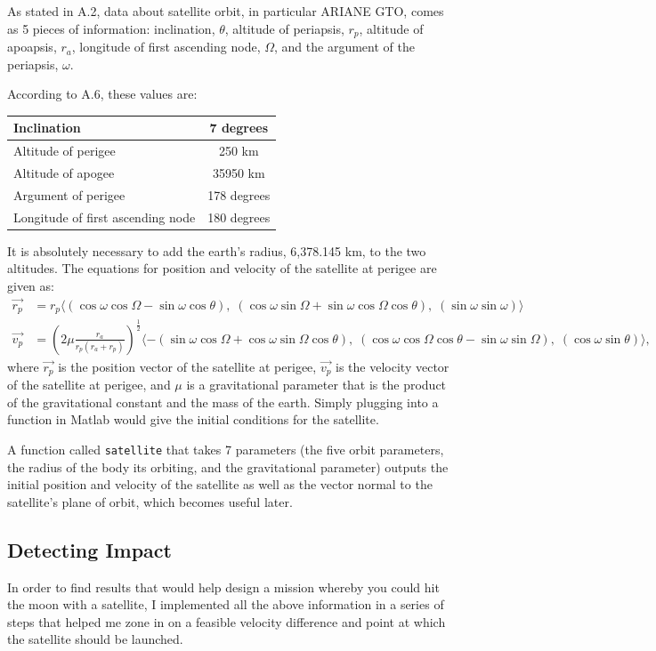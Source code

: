 \documentclass{article}
\begin{document}
As stated in A.2, data about satellite orbit, in particular ARIANE
GTO, comes as 5 pieces of information: inclination, $\theta$, altitude of
periapsis, $r_p$, altitude of apoapsis, $r_a$, longitude of first
ascending node, $\Omega$, and the argument of the periapsis, $\omega$.

According to A.6, these values are: \\
\begin{tabular}{|l|c|}
  \hline
  Inclination & 7 degrees \\ \hline
  Altitude of perigee & 250 km \\ \hline
  Altitude of apogee & 35950 km\\ \hline
  Argument of perigee & 178 degrees \\ \hline
  Longitude of first ascending node & 180 degrees \\ 
  \hline
\end{tabular}
\bigskip

\noindent
It is absolutely necessary to add the earth's radius, 6,378.145 km,
to the two altitudes.
The equations for position and velocity of the satellite at
perigee are given as:
\begin{align}
  \vec{r_p} &= r_p  \langle
  (\cos{\omega}\cos{\Omega}-\sin{\omega}\cos{\theta}), \;
  (\cos{\omega}\sin{\Omega}+\sin{\omega}\cos{\Omega}\cos{\theta}), \;
  (\sin{\omega}\sin{\omega}) \rangle \\
  \vec{v_p} &= (2\mu\frac{r_a}{r_p(r_a+r_p)})^{\frac{1}{2}}
  \langle
  -(\sin{\omega}\cos{\Omega}+\cos{\omega}\sin{\Omega}\cos{\theta}),
  \;
  (\cos{\omega}\cos{\Omega}\cos{\theta}-\sin{\omega}\sin{\Omega}),
  \;
  (\cos{\omega}\sin{\theta})
  \rangle,
\end{align}
where $\vec{r_p}$ is the position vector of the satellite at perigee,
$\vec{v_p}$ is the velocity vector of the satellite at perigee,
and $\mu$ is a gravitational parameter that is the product of the
gravitational constant and the mass of the earth. Simply plugging into
a function in Matlab would give the initial conditions for the
satellite.

A function called \verb[satellite[ that takes 7 parameters (the five
orbit parameters, the radius of the body its orbiting, and the
gravitational parameter) outputs the initial
position and velocity of the satellite as well as the vector normal to
the satellite's plane of orbit, which becomes useful later.

\subsection{Detecting Impact}
In order to find results that would help design a mission whereby you
could hit the moon with a satellite, I implemented all the above
information in a series of steps that helped me zone in on a feasible
velocity difference and point at which the satellite should be launched.
\end{document}
